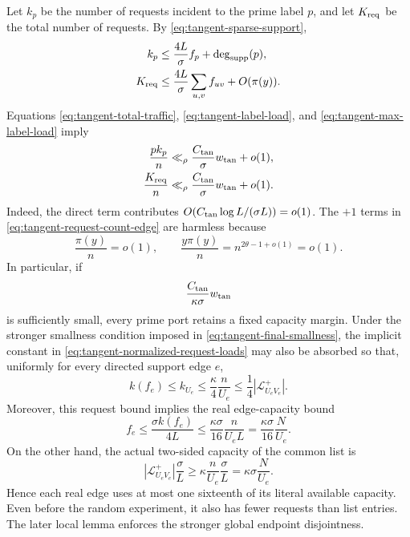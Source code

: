 \documentclass[11pt]{article}
\numberwithin{equation}{section}
\theoremstyle{definition}
\theoremstyle{remark}
\newcommand{\1}{\mathbf 1}
\begin{document}
Let \(k_p\) be the number of requests incident to the prime label \(p\),
and let \(K_{\rm req}\) be the total number of requests.  By
\eqref{eq:tangent-sparse-support},
\begin{align}
 k_p&\leq\frac{4L}{\sigma}f_p+\deg_{\rm supp}(p),\notag\\
 K_{\rm req}
 &\leq\frac{4L}{\sigma}\sum_{u,v}f_{uv}
       +O(\pi(y)).
\label{eq:tangent-request-counts}
\end{align}
Equations \eqref{eq:tangent-total-traffic},
\eqref{eq:tangent-label-load}, and
\eqref{eq:tangent-max-label-load} imply
\begin{align}
 \frac{pk_p}{n}
 &\ll_\rho\frac{C_{\rm tan}}{\sigma}w_{\rm tan}+o(1),
       \notag\\
 \frac{K_{\rm req}}n
 &\ll_\rho\frac{C_{\rm tan}}{\sigma}w_{\rm tan}+o(1).
\label{eq:tangent-normalized-request-loads}
\end{align}
Indeed, the direct term contributes
\(O(C_{\rm tan}\log L/(\sigma L))=o(1)\).  The \(+1\) terms in
\eqref{eq:tangent-request-count-edge} are harmless because
\[
 \frac{\pi(y)}n=o(1),\qquad
 \frac{y\pi(y)}n=n^{2\theta-1+o(1)}=o(1).
\]
In particular, if
\begin{equation}
 \frac{C_{\rm tan}}{\kappa\sigma}w_{\rm tan}
\label{eq:tangent-port-smallness}
\end{equation}
is sufficiently small, every prime port retains a fixed capacity margin.
Under the stronger smallness condition imposed in
\eqref{eq:tangent-final-smallness}, the implicit constant in
\eqref{eq:tangent-normalized-request-loads} may also be absorbed so that,
uniformly for every directed support edge \(e\),
\begin{equation}
k(f_e)\leq k_{U_e}\leq\frac{\kappa}{4}\frac n{U_e}
       \leq\frac14|\mathcal L^+_{U_eV_e}|.
\label{eq:tangent-requests-fit-list}
\end{equation}
Moreover, this request bound implies the real edge-capacity bound
\begin{equation}
 f_e\leq\frac{\sigma k(f_e)}{4L}
       \leq\frac{\kappa\sigma}{16}\frac{n}{U_eL}
       =\frac{\kappa\sigma}{16}\frac N{U_e}.
\label{eq:tangent-real-edge-load}
\end{equation}
On the other hand, the actual two-sided capacity of the common list is
\[
 |\mathcal L^+_{U_eV_e}|\frac{\sigma}{L}
       \geq\kappa\frac n{U_e}\frac{\sigma}{L}
       =\kappa\sigma\frac N{U_e}.
\]
Hence each real edge uses at most one sixteenth of its literal available
capacity.  Even before the random experiment, it also has fewer requests
than list entries.  The later local lemma enforces the stronger global
endpoint disjointness.
\end{document}
